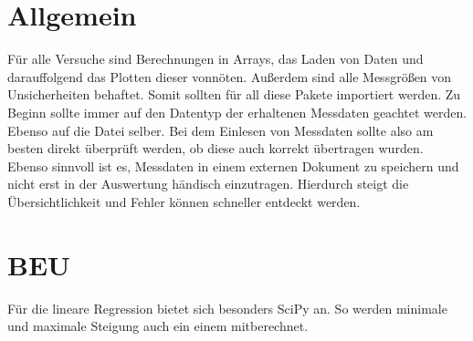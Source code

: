 \documentclass[a4paper,12pt]{article}
\begin{document}
\section*{Allgemein}
Für alle Versuche sind Berechnungen in Arrays, das Laden von Daten und darauffolgend das Plotten dieser vonnöten. Außerdem sind alle Messgrößen von Unsicherheiten behaftet. Somit sollten für all diese Pakete importiert werden.
\newline \newline
Zu Beginn sollte immer auf den Datentyp der erhaltenen Messdaten geachtet werden. Ebenso auf die Datei selber. Bei dem Einlesen von Messdaten sollte also am besten direkt überprüft werden, ob diese auch korrekt übertragen wurden. Ebenso sinnvoll ist es, Messdaten in einem externen Dokument zu speichern und nicht erst in der Auswertung händisch einzutragen. Hierdurch steigt die Übersichtlichkeit und Fehler können schneller entdeckt werden.



\setcounter{section}{1} %

\section{BEU}

\begin{center}
\begin{tcolorbox}[colback=gray!20, colframe=red, width=0.8\textwidth, boxrule=1pt, arc=1mm]
Für die lineare Regression bietet sich besonders SciPy an. So werden minimale und maximale Steigung auch ein einem mitberechnet.
\end{tcolorbox}
\end{center}
\end{document}
